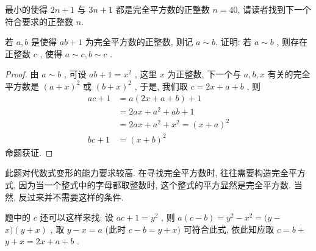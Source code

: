 \begin{note}
	最小的使得 $2 n+1$ 与 $3 n+1$ 都是完全平方数的正整数 $n=40$, 请读者找到下一个符合要求的正整数 $n$.
\end{note}

\begin{example}
	若 $a ,  b$ 是使得 $a b+1$ 为完全平方数的正整数, 则记 $a \sim b$. 证明: 若 $a \sim b$ , 则存在正整数 $c$ , 使得 $a \sim c, b \sim c$ .
\end{example}
\begin{proof}
	由 $a \sim b$ , 可设 $a b+1=x^{2}$ , 这里 $x$ 为正整数, 下一个与 $a ,  b ,  x$ 有关的完全平方数是 $(a+x)^{2}$ 或 $(b+x)^{2}$ , 于是, 我们取 $c=2 x+a+b$ , 则
	\begin{align}
		a c+1 & =a(2 x+a+b)+1                \\
		      & =2 a x+a^{2}+a b+1           \\
		      & =2 a x+a^{2}+x^{2}=(x+a)^{2} \\
		b c+1 & =(x+b)^{2}
	\end{align}
	命题获证.
\end{proof}
\begin{note}
	此题对代数式变形的能力要求较高. 在寻找完全平方数时, 往往需要构造完全平方式, 因为当一个整式中的字母都取整数时, 这个整式的平方显然是完全平方数. 当然, 反过来并不需要这样的条件.

	题中的 $c$ 还可以这样来找: 设 $a c+1=y^{2}$ , 则 $a(c-b)=y^{2}-x^{2}=(y-$ $x)(y+x)$ , 取 $y-x=a$ (此时 $c-b=y+x)$ 可符合此式, 依此知应取 $c=b+$ $y+x=2 x+a+b$ .
\end{note}

